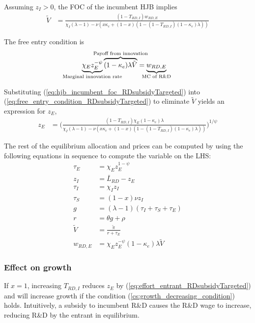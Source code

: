 \documentclass[11pt,english]{article}
\theoremstyle{remark}
\begin{document}
Assuming $z_I > 0$, the FOC of the incumbent HJB implies
\begin{align}
\tilde{V} &= \frac{(1-T_{RD,I})w_{RD,E}}{\chi_I(\lambda -1) - \nu (x\kappa_c + (1-x)(1 - (1-T_{RD,I})(1-\kappa_e)\lambda)) } \label{eq:hjb_incumbent_foc_RDsubsidyTargeted}
\end{align}

The free entry condition is
\begin{align}
\underbrace{\chi_E z_E^{-\psi}}_{\mathclap{\text{Marginal innovation rate}}} \overbrace{(1-\kappa_e) \lambda \tilde{V}}^{\mathclap{\text{Payoff from innovation}}} &= \underbrace{w_{RD,E}}_{\mathclap{\text{MC of R\&D}}} \label{eq:free_entry_condition_RDsubsidyTargeted}
\end{align}

Substituting (\ref{eq:hjb_incumbent_foc_RDsubsidyTargeted}) into (\ref{eq:free_entry_condition_RDsubsidyTargeted}) to eliminate $\tilde{V}$ yields an expression for $z_E$, 
\begin{align}
z_E &= \Bigg( \frac{(1-T_{RD,I})\chi_E (1-\kappa_{e}) \lambda}{\chi_I(\lambda -1) - \nu (x\kappa_c + (1-x)(1 - (1-T_{RD,I})(1-\kappa_e)\lambda)) } \Bigg)^{1/\psi} \label{eq:effort_entrant_RDsubsidyTargeted}
\end{align}

The rest of the equilibrium allocation and prices can be computed by using the following equations in sequence to compute the variable on the LHS:
\begin{align}
\tau_E &= \chi_E z_E^{1-\psi} \\
z_I &= \bar{L}_{RD} - z_E \label{eq:labor_resource_constraint_RDsubsidyTargeted}\\ 
\tau_I &= \chi_I z_I \\
\tau_S &= (1-x) \nu z_I \\
g &= (\lambda - 1) (\tau_I + \tau_S + \tau_E) \\
r &= \theta g + \rho \\
\tilde{V} &= \frac{\tilde{\pi}}{r + \tau_E} \\ 
w_{RD,E} &= \chi_E z_E^{-\psi} (1-\kappa_e) \lambda \tilde{V} \label{eq:wage_rd_labor_RDsubsidyTargeted}
\end{align}

\subsubsection{Effect on growth}

If $x = 1$, increasing $T_{RD,I}$ reduces $z_E$ by (\ref{eq:effort_entrant_RDsubsidyTargeted}) and will increase growth if the condition (\ref{cs:growth_decreasing_condition}) holds. Intuitively, a subsidy to incumbent R\&D causes the R\&D wage to increase, reducing R\&D by the entrant in equilibrium. 
\end{document}
